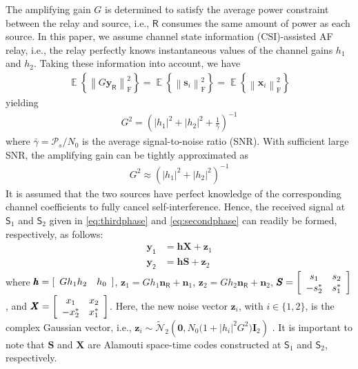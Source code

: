 \documentclass[conference]{IEEEtran}
\DeclareMathOperator{\E}{\mathbb{E}}
\newcommand{\B}[1]{{\pmb{#1}}}
\newcommand{\EX}[1]{\E\left\{{#1}\right\}}
\newcommand{\FN}[1]{\left\|{#1}\right\|_\mathrm{F}}
\newcommand{\CGV}[3]{\tilde{\mathcal{N}}_{#1}\left({#2},{#3}\right)}
\newcommand{\Source}[1]{\mathsf{S}_{#1}}
\newcommand{\Relay}{\mathsf{R}}
\newcommand{\Ps}{\mathcal{P}_s}
\newcommand{\y}[1]{\B{y}_{\mathsf{{#1}}}}
\newcommand{\h}[1]{h_{#1}}
\newcommand{\hnew}{\B{h}}
\newcommand{\s}[1]{\B{s}_{#1}}
\newcommand{\x}[1]{\B{x}_{#1}}
\newcommand{\nR}{\B{n}_{\mathsf{R}}}
\newcommand{\n}[1]{\B{n}_{#1}}
\newcommand{\z}[1]{\B{z}_{#1}}
\newcommand{\Gain}{G}
\newcommand{\snrave}{\bar\gamma}
\begin{document}
The amplifying gain $\Gain$ is determined to satisfy the average
power constraint between the relay and source, i.e., $\Relay$
consumes the same amount of power as each source. In this paper, we
assume channel state information (CSI)-assisted AF relay, i.e., the
relay perfectly knows instantaneous values of the channel gains
$\h{1}$ and $\h{2}$. Taking these information into account, we have
%
%
\begin{align}
    \EX{\FN{\Gain \y{R}}^2} = \EX{\FN{\s{i}}^2} =\EX{\FN{\x{i}}^2}
\end{align}
%
%
yielding
%
%
\begin{align}    \label{eq:Gain:1}
    \Gain^2 = \left(|\h{1}|^2+ |\h{2}|^2 + \frac{1}{\snrave}\right)^{-1}
\end{align}
%
%
where $\snrave=\Ps/N_0$ is the average signal-to-noise ratio (SNR).
With sufficient large SNR, the amplifying gain can be tightly
approximated as
%
%
\begin{align}    \label{eq:Gain:2}
    \Gain^2 \approx \left(|\h{1}|^2+ |\h{2}|^2 \right)^{-1}
\end{align}
%
%
It is assumed that the two sources have perfect knowledge of the
corresponding channel coefficients to fully cancel
self-interference. Hence, the received signal at $\Source{1}$ and
$\Source{2}$ given in \eqref{eq:thirdphase} and
\eqref{eq:secondphase} can readily be formed, respectively, as
follows:
%
%
\begin{align} \label{eq:si}
    \y{1}
    &=
    \hnew \B{X} + \z{1}
    \\
    \y{2}
    &=
    \hnew \B{S} + \z{2}
\end{align}
%
%
where $\hnew= [ {\begin{array}{*{20}c}{\Gain\h{1}\h{2} } & {\h{0} }  \\
\end{array}}]$, $\z{1}=\Gain \h{1} \nR + \n{1}$, $\z{2}=\Gain \h{2} \nR + \n{2}$, $ \B{S} = \left[ {\begin{array}{*{20}c} {s_1 } & {s_2 }  \\ { - s_2^ *  } & {s_1^ *  }
 \\ \end{array} } \right]$, and $ \B{X} = \left[ {\begin{array}{*{20}c} {x_1 } & {x_2 }  \\ { - x_2^ *  } & {x_1^ *  }
 \\ \end{array} } \right]$. Here, the new noise vector $\z{i}$, with $i \in \{1,2\}$, is the complex Gaussian vector, i.e., $\z{i} \sim \CGV{2}{\B{0}}{N_0\bigl(1+\left|\h{i}\right|^2\Gain^2\bigr)\B{I}_2}$ .
It is important to note that $\B{S}$ and $\B{X}$ are Alamouti
space-time codes constructed at $\Source{1}$ and $\Source{2}$,
respectively.
\end{document}
